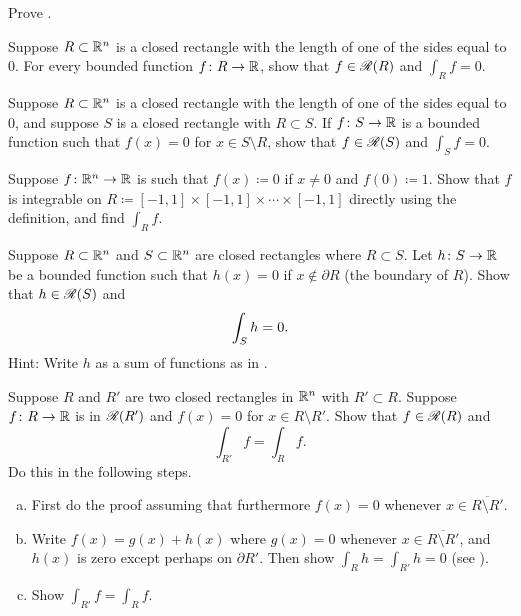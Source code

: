\begin{exercise}
Prove .
\end{exercise}


\begin{exercise}
Suppose $R \subset {\mathbb{R}}^n$ is a closed rectangle with the length of one of the sides equal to 0.
For every bounded function $f \colon R \to {\mathbb{R}}$, show that $f \in {\mathscr{R}}(R)$ and $\int_R f = 0$.
\end{exercise}

\begin{exercise} \label{mv:zerosiderectangle}
Suppose $R \subset {\mathbb{R}}^n$ is a closed rectangle with the length of one of the sides equal to 0,
and suppose $S$ is a closed rectangle with $R \subset S$.
If $f \colon S \to {\mathbb{R}}$
is a bounded function such that $f(x) = 0$ for $x \in S \setminus R$, show
that $f \in {\mathscr{R}}(S)$ and $\int_S f = 0$.
\end{exercise}

\begin{exercise}
Suppose $f\colon {\mathbb{R}}^n \to {\mathbb{R}}$ is such that
$f(x) \coloneqq 0$ if $x \neq 0$ and $f(0) \coloneqq 1$.  Show that $f$ is integrable
on $R \coloneqq [-1,1] \times [-1,1] \times \cdots \times [-1,1]$ directly using the
definition, and find $\int_R f$.
\end{exercise}

\begin{exercise} \label{mv:zeroinside}
Suppose $R \subset {\mathbb{R}}^n$ and $S \subset {\mathbb{R}}^n$ are closed rectangles
where $R \subset S$.
Let $h \colon S \to {\mathbb{R}}$ be a bounded function
such that $h(x) = 0$ if $x \notin \partial R$ (the boundary of $R$).
Show that $h \in {\mathscr{R}}(S)$ and
\begin{equation*}
\int_{S} h = 0 .
\avoidbreak
\end{equation*}
Hint: Write $h$ as a sum of functions as in .
\end{exercise}

\begin{exercise} \label{mv:zerooutside}
Suppose $R$ and $R'$ are two closed rectangles
in ${\mathbb{R}}^n$
with $R' \subset R$.  Suppose $f \colon R \to {\mathbb{R}}$ is in ${\mathscr{R}}(R')$
and $f(x) = 0$ for $x \in R \setminus R'$.
Show that $f \in {\mathscr{R}}(R)$ and
\begin{equation*}
\int_{R'} f = \int_R f .
\end{equation*}
Do this in the following steps.
\begin{enumerate}[a)]
\item
First do the proof assuming that furthermore $f(x) = 0$ whenever $x
\in \overline{R \setminus R'}$.
\item
Write $f(x) = g(x) + h(x)$ where $g(x) = 0$ whenever $x
\in \overline{R \setminus R'}$, and $h(x)$ is zero except perhaps on
$\partial R'$.
Then show $\int_R h = \int_{R'} h = 0$ (see ).
\item
Show 
$\int_{R'} f = \int_R f$.
\end{enumerate}
\end{exercise}

